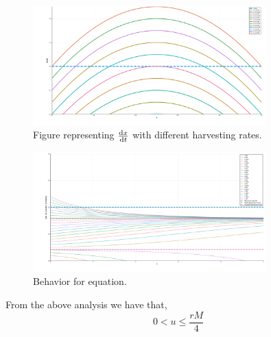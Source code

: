 \begin{figure}[H]
	\centering
	\includegraphics[width=0.8\textwidth]{CriticalPoints.png}
	\caption{Figure representing $\frac{\mathrm{d} x}{{\mathrm{d} t}}$ with different harvesting rates.}
	\label{fig: CriticalPoints}
\end{figure}
\begin{figure}
		\centering
		\includegraphics[width=0.8\textwidth]{SustainableConstant.png}
		\caption{Behavior for equation.}
		\label{fig: SustainableConstantHarvest}
\end{figure}
From the above analysis we have that,
\begin{equation}
0<u\leq\frac{rM}{4}
\end{equation}

